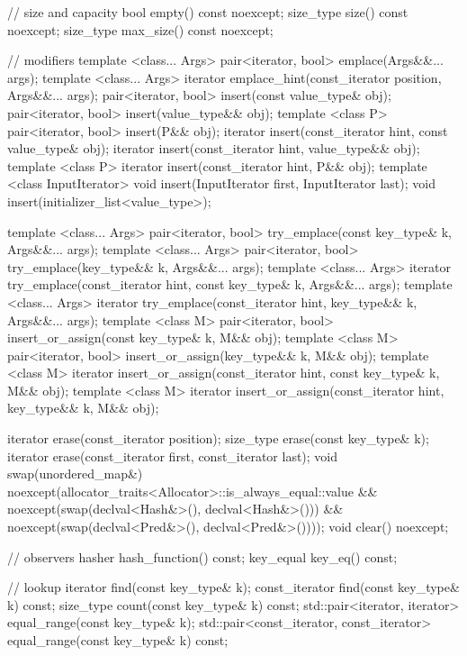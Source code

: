 \begin{codeblock}
{{    // size and capacity
    bool      empty() const noexcept;
    size_type size() const noexcept;
    size_type max_size() const noexcept;

    // modifiers
    template <class... Args> pair<iterator, bool> emplace(Args&&... args);
    template <class... Args> iterator emplace_hint(const_iterator position, Args&&... args);
    pair<iterator, bool> insert(const value_type& obj);
    pair<iterator, bool> insert(value_type&& obj);
    template <class P> pair<iterator, bool> insert(P&& obj);
    iterator       insert(const_iterator hint, const value_type& obj);
    iterator       insert(const_iterator hint, value_type&& obj);
    template <class P> iterator insert(const_iterator hint, P&& obj);
    template <class InputIterator> void insert(InputIterator first, InputIterator last);
    void insert(initializer_list<value_type>);

    template <class... Args>
      pair<iterator, bool> try_emplace(const key_type& k, Args&&... args);
    template <class... Args>
      pair<iterator, bool> try_emplace(key_type&& k, Args&&... args);
    template <class... Args>
      iterator try_emplace(const_iterator hint, const key_type& k, Args&&... args);
    template <class... Args>
      iterator try_emplace(const_iterator hint, key_type&& k, Args&&... args);
    template <class M>
      pair<iterator, bool> insert_or_assign(const key_type& k, M&& obj);
    template <class M>
      pair<iterator, bool> insert_or_assign(key_type&& k, M&& obj);
    template <class M>
      iterator insert_or_assign(const_iterator hint, const key_type& k, M&& obj);
    template <class M>
      iterator insert_or_assign(const_iterator hint, key_type&& k, M&& obj);

    iterator  erase(const_iterator position);
    size_type erase(const key_type& k);
    iterator  erase(const_iterator first, const_iterator last);
    void      swap(unordered_map&)
      noexcept(allocator_traits<Allocator>::is_always_equal::value &&
               noexcept(swap(declval<Hash&>(), declval<Hash&>())) &&
               noexcept(swap(declval<Pred&>(), declval<Pred&>())));
    void      clear() noexcept;

    // observers
    hasher hash_function() const;
    key_equal key_eq() const;

    // lookup
    iterator       find(const key_type& k);
    const_iterator find(const key_type& k) const;
    size_type      count(const key_type& k) const;
    std::pair<iterator, iterator>             equal_range(const key_type& k);
    std::pair<const_iterator, const_iterator> equal_range(const key_type& k) const;

}}
\end{codeblock}
